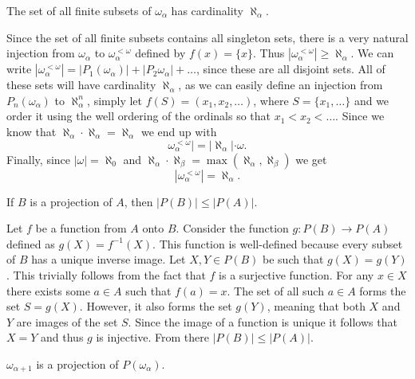 \begin{problem}
  The set of all finite subsets of $\omega_{\alpha}$ has cardinality $\aleph_{\alpha}$.
\end{problem}

\begin{solution}
  Since the set of all finite subsets contains all singleton sets, there is a very natural injection from $\omega_{\alpha}$ to $\omega_{\alpha}^{<\omega}$ defined by $f(x) = \{x\}$.
  Thus $|\omega_{\alpha}^{<\omega}| \ge \aleph_{\alpha}$.
  We can write $|\omega_{\alpha}^{<\omega}| = |P_1 (\omega_{\alpha})| + |P_2 \omega_{\alpha}| + \ldots$, since these are all disjoint sets.
  All of these sets will have cardinality $\aleph_{\alpha}$, as we can easily define an injection from $P_n (\omega_{\alpha})$ to $\aleph_{\alpha}^{n}$, simply let $f(S) = (x_1, x_2, \ldots)$, where $S = \{x_1, \ldots\}$ and we order it using the well ordering of the ordinals so that $x_1 < x_2 < \ldots$.
  Since we know that $\aleph_{\alpha} \cdot \aleph_{\alpha} = \aleph_{\alpha}$ we end up with
  \[\omega_{\alpha}^{<\omega}| = |\aleph_{\alpha}| \cdot \omega.\]
  Finally, since $|\omega| = \aleph_0$ and $\aleph_{\alpha} \cdot \aleph_{\beta} = \max (\aleph_{\alpha}, \aleph_{\beta})$ we get
  \[|\omega_{\alpha}^{<\omega}| = \aleph_{\alpha}.\]
\end{solution}

\begin{problem}
  If $B$ is a projection of $A$, then $|P(B)| \le |P(A)|$.
\end{problem}

\begin{solution}
  Let $f$ be a function from $A$ onto $B$.
  Consider the function $g: P(B) \to P(A)$ defined as $g(X) = f^{-1} (X)$.
  This function is well-defined because every subset of $B$ has a unique inverse image.
  Let $X, Y \in P(B)$ be such that $g(X) = g(Y)$.
  This trivially follows from the fact that $f$ is a surjective function.
  For any $x \in X$ there exists some $a \in A$ such that $f(a) = x$.
  The set of all such $a \in A$ forms the set $S = g(X)$.
  However, it also forms the set $g(Y)$, meaning that both $X$ and $Y$ are images of the set $S$.
  Since the image of a function is unique it follows that $X = Y$ and thus $g$ is injective.
  From there $|P(B)| \le |P(A)|$.
\end{solution}

\begin{problem}
  $\omega_{\alpha + 1}$ is a projection of $P(\omega_{\alpha})$.
\end{problem}

